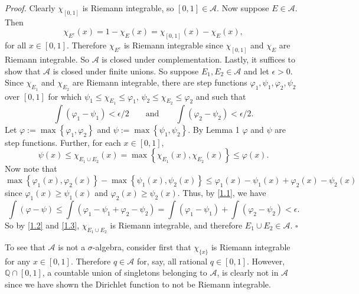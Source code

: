 \documentclass[12pt]{article}
\newcounter{ProofCounter}
\newenvironment{Proof}{\stepcounter{ProofCounter}\textit{Proof.}}{\hfill$\square$}
\begin{document}
\begin{Proof}
Clearly $\chi_{[0,1]}$ is Riemann integrable, so $[0,1] \in \mathcal{A}$. Now suppose $E \in \mathcal{A}$. Then 
\[ \chi_{E^{c}}(x) = 1 - \chi_{E}(x) = \chi_{[0,1]}(x) - \chi_{E}(x),\]
for all $x \in [0,1]$. Therefore $\chi_{E^{c}}$ is Riemann integrable since $\chi_{[0,1]}$ and $\chi_{E}$ are Riemann integrable. So $\mathcal{A}$ is
closed under complementation. Lastly, it suffices to show that $\mathcal{A}$ is closed under finite unions. So suppose $E_{1}, E_{2} \in \mathcal{A}$
and let $\epsilon > 0$. Since $\chi_{E_{1}}$ and $\chi_{E_{2}}$ are Riemann integrable, there are step functions $\varphi_{1}, \psi_{1}, \varphi_{2},
\psi_{2}$ over $[0,1]$ for which $\psi_{1} \leq \chi_{E_{1}} \leq \varphi_{1}$, $\psi_{2} \leq \chi_{E_{2}} \leq \varphi_{2}$ and such that
\begin{equation}
\int (\varphi_{1} - \psi_{1}) < \epsilon / 2 \qquad \text{and}\qquad \int (\varphi_{2} - \psi_{2}) < \epsilon / 2.
\label{1.1}
\end{equation}
Let $\varphi := \max\left\{ \varphi_{1}, \varphi_{2} \right\}$ and $\psi:= \max\left\{ \psi_{1}, \psi_{2} \right\}$. By Lemma 1 $\varphi$ and $\psi$
are step functions. Further, for each $x \in [0,1]$,
\begin{equation}
\psi(x) \leq \chi_{E_{1} \cup E_{2}}(x) = \max\left\{ \chi_{E_{1}}(x), \chi_{E_{2}}(x) \right\} \leq \varphi(x).
\label{1.2}
\end{equation}
Now note that 
\[ \max\left\{ \varphi_{1}(x), \varphi_{2}(x) \right\} - \max\left\{ \psi_{1}(x), \psi_{2}(x) \right\} \leq \varphi_{1}(x) - \psi_{1}(x) +
\varphi_{2}(x) -\psi_{2}(x)\] 
since $\varphi_{1}(x) \geq \psi_{1}(x)$ and $\varphi_{2}(x) \geq \psi_{2}(x)$. Thus, by \eqref{1.1}, we have 
\begin{equation}
\int (\varphi - \psi) \leq \int (\varphi_{1} - \psi_{1} + \varphi_{2} - \psi_{2}) = \int (\varphi_{1} - \psi_{1}) + \int (\varphi_{2} - \psi_{2}) <
\epsilon. 
\label{1.3}
\end{equation}
So by \eqref{1.2} and \eqref{1.3}, $\chi_{E_{1}\cup E_{2}}$ is Riemann integrable, and therefore $E_{1} \cup E_{2} \in \mathcal{A}$.
\end{Proof}

To see that $\mathcal{A}$ is not a $\sigma$-algebra, consider first that $\chi_{\{x\}}$ is Riemann integrable for any $x \in [0,1]$. Therefore $q \in
\mathcal{A}$ for, say, all rational $q \in [0,1]$. However, $\mathbb{Q}\cap [0,1]$, a countable union of singletons belonging to $\mathcal{A}$, is
clearly not in $\mathcal{A}$ since we have shown the Dirichlet function to not be Riemann integrable.
\end{document}
